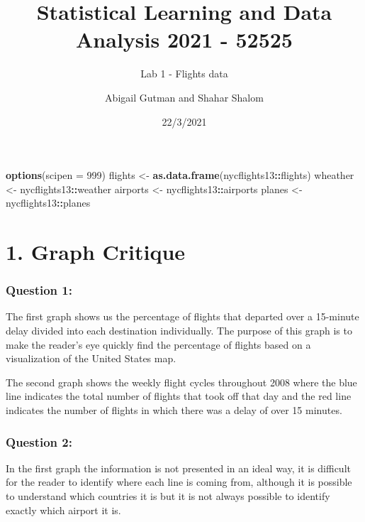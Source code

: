 \documentclass[
]{article}
\title{Statistical Learning and Data Analysis 2021 - 52525}
\subtitle{Lab 1 - Flights data}
\author{Abigail Gutman and Shahar Shalom}
\date{22/3/2021}
\newenvironment{Shaded}{\begin{snugshade}}{\end{snugshade}}
\newcommand{\DataTypeTok}[1]{\textcolor[rgb]{0.13,0.29,0.53}{#1}}
\newcommand{\DecValTok}[1]{\textcolor[rgb]{0.00,0.00,0.81}{#1}}
\newcommand{\KeywordTok}[1]{\textcolor[rgb]{0.13,0.29,0.53}{\textbf{#1}}}
\newcommand{\NormalTok}[1]{#1}
\newcommand{\OperatorTok}[1]{\textcolor[rgb]{0.81,0.36,0.00}{\textbf{#1}}}
\newcommand{\StringTok}[1]{\textcolor[rgb]{0.31,0.60,0.02}{#1}}
\begin{document}
\maketitle

\begin{Shaded}
\begin{Highlighting}[]
\KeywordTok{options}\NormalTok{(}\DataTypeTok{scipen =} \DecValTok{999}\NormalTok{)}
\NormalTok{flights <-}\StringTok{ }\KeywordTok{as.data.frame}\NormalTok{(nycflights13}\OperatorTok{::}\NormalTok{flights)}
\NormalTok{wheather <-}\StringTok{ }\NormalTok{nycflights13}\OperatorTok{::}\NormalTok{weather}
\NormalTok{airports <-}\StringTok{ }\NormalTok{nycflights13}\OperatorTok{::}\NormalTok{airports}
\NormalTok{planes <-}\StringTok{ }\NormalTok{nycflights13}\OperatorTok{::}\NormalTok{planes}
\end{Highlighting}
\end{Shaded}

\hypertarget{graph-critique}{%
\section{\texorpdfstring{\textbf{1. Graph
Critique}}{1. Graph Critique}}\label{graph-critique}}

\hypertarget{question-1}{%
\subsubsection{Question 1:}\label{question-1}}

The first graph shows us the percentage of flights that departed over a
15-minute delay divided into each destination individually. The purpose
of this graph is to make the reader's eye quickly find the percentage of
flights based on a visualization of the United States map.

The second graph shows the weekly flight cycles throughout 2008 where
the blue line indicates the total number of flights that took off that
day and the red line indicates the number of flights in which there was
a delay of over 15 minutes.

\hypertarget{question-2}{%
\subsubsection{Question 2:}\label{question-2}}

In the first graph the information is not presented in an ideal way, it
is difficult for the reader to identify where each line is coming from,
although it is possible to understand which countries it is but it is
not always possible to identify exactly which airport it is.
\end{document}
